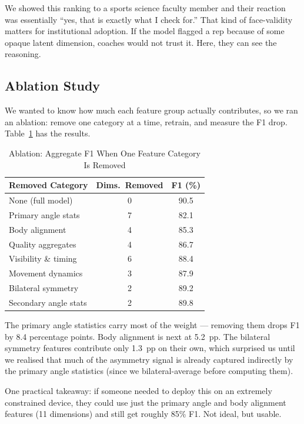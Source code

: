 \documentclass[conference]{IEEEtran}
\begin{document}
We showed this ranking to a sports science faculty member and their reaction was essentially ``yes, that is exactly what I check for.'' That kind of face-validity matters for institutional adoption. If the model flagged a rep because of some opaque latent dimension, coaches would not trust it. Here, they can see the reasoning.

\subsection{Ablation Study}

We wanted to know how much each feature group actually contributes, so we ran an ablation: remove one category at a time, retrain, and measure the F1 drop. Table~\ref{tab:ablation} has the results.

\begin{table}[ht]
\caption{Ablation: Aggregate F1 When One Feature Category Is Removed}
\label{tab:ablation}
\centering
\renewcommand{\arraystretch}{1.15}
\begin{tabular}{@{}lcc@{}}
\toprule
\textbf{Removed Category} & \textbf{Dims.\ Removed} & \textbf{F1 (\%)} \\
\midrule
None (full model) & 0 & 90.5 \\
Primary angle stats & 7 & 82.1 \\
Body alignment & 4 & 85.3 \\
Quality aggregates & 4 & 86.7 \\
Visibility \& timing & 6 & 88.4 \\
Movement dynamics & 3 & 87.9 \\
Bilateral symmetry & 2 & 89.2 \\
Secondary angle stats & 2 & 89.8 \\
\bottomrule
\end{tabular}
\end{table}

The primary angle statistics carry most of the weight --- removing them drops F1 by 8.4 percentage points. Body alignment is next at 5.2~pp. The bilateral symmetry features contribute only 1.3~pp on their own, which surprised us until we realised that much of the asymmetry signal is already captured indirectly by the primary angle statistics (since we bilateral-average before computing them).

One practical takeaway: if someone needed to deploy this on an extremely constrained device, they could use just the primary angle and body alignment features (11 dimensions) and still get roughly 85\% F1. Not ideal, but usable.
\end{document}
